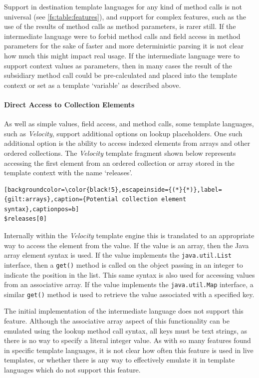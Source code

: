Support in destination template languages for any kind of method calls is not universal (see \autoref{fs:table:features}), and support for complex features, such as the use of the results of method calls as method parameters, is rarer still. If the intermediate language were to forbid method calls and field access in method parameters for the sake of faster and more deterministic parsing it is not clear how much this might impact real usage. If the intermediate language were to support context values as parameters, then in many cases the result of the subsidiary method call could be pre-calculated and placed into the template context or set as a template `variable' as described above.

\paragraph{Direct Access to Collection Elements}

As well as simple values, field access, and method calls, some template languages, such as \emph{Velocity}, support additional options on lookup placeholders. One such additional option is the ability to access indexed elements from arrays and other ordered collections. The \emph{Velocity} template fragment shown below represents accessing the first element from an ordered collection or array stored in the template context with the name `releases'.

\begin{lstlisting}[backgroundcolor=\color{black!5},escapeinside={(*}{*)},label={gilt:arrays},caption={Potential collection element syntax},captionpos=b]
$releases[0]
\end{lstlisting}

Internally within the \emph{Velocity} template engine this is translated to an appropriate way to access the element from the value. If the value is an array, then the Java array element syntax is used. If the value implements the \verb!java.util.List! interface, then a \verb!get()! method is called on the object passing in an integer to indicate the position in the list. This same syntax is also used for accessing values from an associative array. If the value implements the \verb!java.util.Map! interface, a similar \verb!get()! method is used to retrieve the value associated with a specified key.

The initial implementation of the intermediate language does not support this feature. Although the associative array aspect of this functionality can be emulated using the lookup method call syntax, all keys must be text strings, as there is no way to specify a literal integer value. As with so many features found in specific template languages, it is not clear how often this feature is used in live templates, or whether there is any way to effectively emulate it in template languages which do not support this feature.

